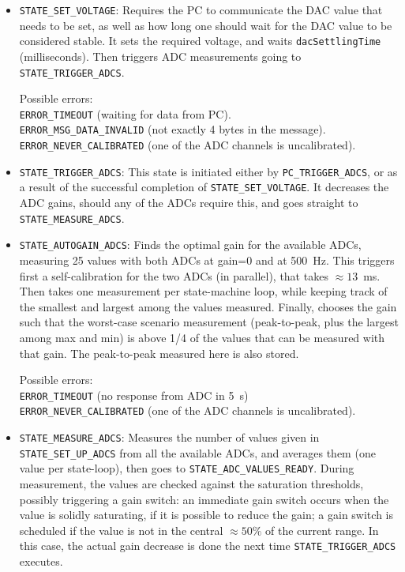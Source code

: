 \documentclass[11pt,a4paper,english]{article}
\begin{document}
\begin{itemize}
\item \texttt{STATE\_SET\_VOLTAGE}: Requires the PC to communicate the DAC value that needs to be set, as well as how long one should wait for the DAC value to be considered stable. It sets the required voltage, and waits \texttt{dacSettlingTime} (milliseconds). Then triggers ADC measurements going to \texttt{STATE\_TRIGGER\_ADCS}.
	
	Possible errors:\\\texttt{ERROR\_TIMEOUT} (waiting for data from PC).\\\texttt{ERROR\_MSG\_DATA\_INVALID} (not exactly 4 bytes in the message).\\\texttt{ERROR\_NEVER\_CALIBRATED} (one of the ADC channels is uncalibrated).

\item \texttt{STATE\_TRIGGER\_ADCS}: This state is initiated either by \texttt{PC\_TRIGGER\_ADCS}, or as a result of the successful completion of \texttt{STATE\_SET\_VOLTAGE}. It decreases the ADC gains, should any of the ADCs require this, and goes straight to \texttt{STATE\_MEASURE\_ADCS}.

\item \texttt{STATE\_AUTOGAIN\_ADCS}: Finds the optimal gain for the available ADCs, measuring 25 values with both ADCs at gain=0 and at 500~Hz. This triggers first a self-calibration for the two ADCs (in parallel), that takes $\approx13$~ms. Then takes one measurement per state-machine loop, while keeping track of the smallest and largest among the values measured. Finally, chooses the gain such that the worst-case scenario measurement (peak-to-peak, plus the largest among max and min) is above 1/4 of the values that can be measured with that gain. The peak-to-peak measured here is also stored.

	Possible errors:\\\texttt{ERROR\_TIMEOUT} (no response from ADC in 5~s)\\\texttt{ERROR\_NEVER\_CALIBRATED} (one of the ADC channels is uncalibrated).

\item \texttt{STATE\_MEASURE\_ADCS}: Measures the number of values given in \texttt{STATE\_SET\_UP\_ADCS} from all the available ADCs, and averages them (one value per state-loop), then goes to \texttt{STATE\_ADC\_VALUES\_READY}. During measurement, the values are checked against the saturation thresholds, possibly triggering a gain switch: an immediate gain switch occurs when the value is solidly saturating, if it is possible to reduce the gain; a gain switch is scheduled if the value is not in the central $\approx50\%$ of the current range. In this case, the actual gain decrease is done the next time \texttt{STATE\_TRIGGER\_ADCS} executes.


\end{itemize}
\end{document}
